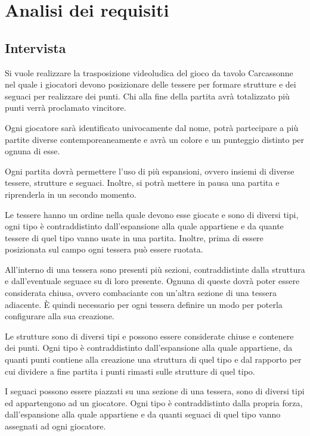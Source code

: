 \section{Analisi dei requisiti}
\subsection{Intervista}
Si vuole realizzare la trasposizione videoludica del gioco da tavolo Carcassonne \cite{Carcassonne} nel quale i giocatori devono posizionare delle tessere per formare strutture e dei seguaci per realizzare dei punti. Chi alla fine della partita avrà totalizzato più punti verrà proclamato vincitore.
\medskip

Ogni giocatore sarà identificato univocamente dal nome, potrà partecipare a più partite diverse contemporeaneamente e avrà un colore e un punteggio distinto per ognuna di esse.
\medskip

Ogni partita dovrà permettere l'uso di più espansioni, ovvero insiemi di diverse tessere, strutture e seguaci. Inoltre, si potrà mettere in pausa una partita e riprenderla in un secondo momento.
\medskip

Le tessere hanno un ordine nella quale devono esse giocate e sono di diversi tipi, ogni tipo è contraddistinto dall'espansione alla quale appartiene e da quante tessere di quel tipo vanno usate in una partita. Inoltre, prima di essere posizionata sul campo ogni tessera può essere ruotata.
\medskip

All'interno di una tessera sono presenti più sezioni, contraddistinte dalla struttura e dall'eventuale seguace su di loro presente. Ognuna di queste dovrà poter essere considerata chiusa, ovvero combaciante con un'altra sezione di una tessera adiacente. È quindi necessario per ogni tessera definire un modo per poterla configurare alla sua creazione.
\medskip

Le strutture sono di diversi tipi e possono essere considerate chiuse e contenere dei punti. Ogni tipo è contraddistinto dall'espansione alla quale appartiene, da quanti punti contiene alla creazione una struttura di quel tipo e dal rapporto per cui dividere a fine partita i punti rimasti sulle strutture di quel tipo.
\medskip

I seguaci possono essere piazzati su una sezione di una tessera, sono di diversi tipi ed appartengono ad un giocatore. Ogni tipo è contraddistinto dalla propria forza, dall'espansione alla quale appartiene e da quanti seguaci di quel tipo vanno assegnati ad ogni giocatore.
\medskip

